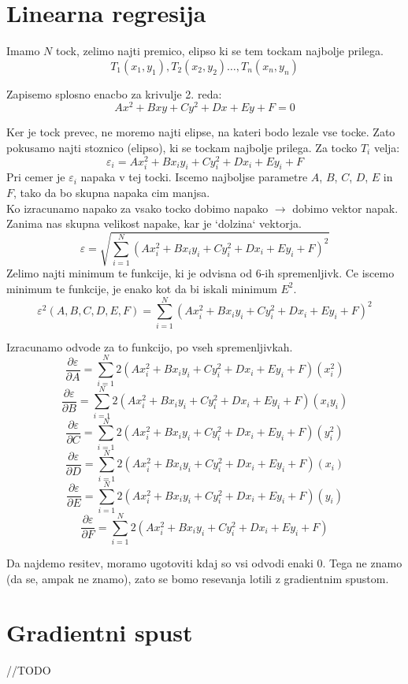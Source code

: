 \documentclass[a4paper, 12pt]{article}
\begin{document}
	\section*{Linearna regresija}
	Imamo $N$ tock, zelimo najti premico, elipso ki se tem tockam najbolje prilega.
	$$T_1(x_1, y_1), T_2(x_2, y_2) \ldots, T_n(x_n, y_n)$$

	Zapisemo splosno enacbo za krivulje 2. reda:
	$$Ax^2 + Bxy + Cy^2 + Dx + Ey + F = 0$$

	Ker je tock prevec, ne moremo najti elipse, na kateri bodo lezale vse tocke. Zato pokusamo najti stoznico (elipso), ki se tockam najbolje prilega. Za tocko $T_i$ velja:
	$$\varepsilon_i = Ax_i^2 + Bx_iy_i + Cy_i^2 + Dx_i + Ey_i + F$$
	Pri cemer je $\varepsilon_i$ napaka v tej tocki. Iscemo najboljse parametre $A$, $B$, $C$, $D$, $E$ in $F$, tako da bo skupna napaka cim manjsa.\\
	Ko izracunamo napako za vsako tocko dobimo napako $\rightarrow$ dobimo vektor napak. Zanima nas skupna velikost napake, kar je `dolzina` vektorja.
	$$\varepsilon = \sqrt{\sum_{i=1}^{N} (Ax_i^2 + Bx_iy_i + Cy_i^2 + Dx_i + Ey_i + F)^2}$$
	Zelimo najti minimum te funkcije, ki je odvisna od 6-ih spremenljivk. Ce iscemo minimum te funkcije, je enako kot da bi iskali minimum $E^2$.
	$$\varepsilon^2(A, B, C, D, E, F) = \sum_{i=1}^{N} (Ax_i^2 + Bx_iy_i + Cy_i^2 + Dx_i + Ey_i + F)^2$$
	
	Izracunamo odvode za to funkcijo, po vseh spremenljivkah.
	$$\frac{\partial \varepsilon}{\partial A} = \sum_{i=1}^{N}2(Ax_i^2 + Bx_iy_i + Cy_i^2 + Dx_i + Ey_i + F)(x_i^2)$$
	$$\frac{\partial \varepsilon}{\partial B} = \sum_{i=1}^{N}2(Ax_i^2 + Bx_iy_i + Cy_i^2 + Dx_i + Ey_i + F)(x_iy_i)$$
	$$\frac{\partial \varepsilon}{\partial C} = \sum_{i=1}^{N}2(Ax_i^2 + Bx_iy_i + Cy_i^2 + Dx_i + Ey_i + F)(y_i^2)$$
	$$\frac{\partial \varepsilon}{\partial D} = \sum_{i=1}^{N}2(Ax_i^2 + Bx_iy_i + Cy_i^2 + Dx_i + Ey_i + F)(x_i)$$
	$$\frac{\partial \varepsilon}{\partial E} = \sum_{i=1}^{N}2(Ax_i^2 + Bx_iy_i + Cy_i^2 + Dx_i + Ey_i + F)(y_i)$$
	$$\frac{\partial \varepsilon}{\partial F} = \sum_{i=1}^{N}2(Ax_i^2 + Bx_iy_i + Cy_i^2 + Dx_i + Ey_i + F)$$


	Da najdemo resitev, moramo ugotoviti kdaj so vsi odvodi enaki 0. Tega ne znamo (da se, ampak ne znamo), zato se bomo resevanja lotili z gradientnim spustom.

	\section*{Gradientni spust}
	//TODO\\
	
\end{document}
